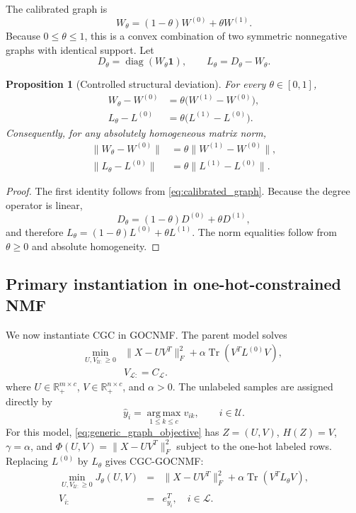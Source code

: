 \documentclass[11pt]{article}
\newtheorem{proposition}{Proposition}
\theoremstyle{remark}
\newcommand{\R}{\mathbb{R}}
\newcommand{\Tr}{\operatorname{Tr}}
\newcommand{\ones}{\mathbf{1}}
\newcommand{\argmaxop}{\operatorname*{arg\,max}}
\begin{document}
The calibrated graph is
\begin{equation}
\label{eq:calibrated_graph}
W_{\theta}=(1-\theta)W^{(0)}+\theta W^{(1)}.
\end{equation}
Because $0\le\theta\le1$, this is a convex combination of two symmetric nonnegative graphs with identical support. Let
\[
D_{\theta}=\operatorname{diag}(W_{\theta}\ones),
\qquad
L_{\theta}=D_{\theta}-W_{\theta}.
\]

\begin{proposition}[Controlled structural deviation]
\label{prop:structural_deviation}
For every $\theta\in[0,1]$,
\[
\begin{aligned}
W_\theta-W^{(0)}
&=\theta\bigl(W^{(1)}-W^{(0)}\bigr),\\
L_\theta-L^{(0)}
&=\theta\bigl(L^{(1)}-L^{(0)}\bigr).
\end{aligned}
\]
Consequently, for any absolutely homogeneous matrix norm,
\[
\begin{aligned}
\|W_\theta-W^{(0)}\|
&=\theta\|W^{(1)}-W^{(0)}\|,\\
\|L_\theta-L^{(0)}\|
&=\theta\|L^{(1)}-L^{(0)}\|.
\end{aligned}
\]
\end{proposition}

\begin{proof}
The first identity follows from \eqref{eq:calibrated_graph}. Because the degree operator is linear,
\[
D_\theta=(1-\theta)D^{(0)}+\theta D^{(1)},
\]
and therefore $L_\theta=(1-\theta)L^{(0)}+\theta L^{(1)}$. The norm equalities follow from $\theta\ge0$ and absolute homogeneity.
\end{proof}

\subsection{Primary instantiation in one-hot-constrained NMF}
\label{subsec:goc_instantiation}

We now instantiate CGC in GOCNMF. The parent model solves
\begin{eqnarray}
\min_{U,V_{\mathcal U:}\ge0}
&\|X-UV^{T}\|_{F}^{2}
+\alpha\Tr(V^{T}L^{(0)}V),\nonumber\\
&V_{\mathcal L:}=C_{\mathcal L}.
\end{eqnarray}
where $U\in\R_{+}^{m\times c}$, $V\in\R_{+}^{n\times c}$, and $\alpha>0$. The unlabeled samples are assigned directly by
\begin{equation}
\label{eq:direct_assignment}
\widehat y_i=\argmaxop_{1\le k\le c}v_{ik},
\qquad i\in\mathcal U.
\end{equation}
For this model, \eqref{eq:generic_graph_objective} has $Z=(U,V)$, $H(Z)=V$, $\gamma=\alpha$, and $\Phi(U,V)=\|X-UV^T\|_F^2$ subject to the one-hot labeled rows. Replacing $L^{(0)}$ by $L_\theta$ gives CGC-GOCNMF:
\begin{eqnarray}
\min_{U,V_{\mathcal U:}\ge0}
J_{\theta}(U,V)
&=&\|X-UV^{T}\|_{F}^{2}
+\alpha\Tr(V^{T}L_{\theta}V),\nonumber\\
V_{i:}&=&e_{y_i}^{T},\quad i\in\mathcal L.\label{eq:cgc_objective}
\end{eqnarray}
\end{document}
